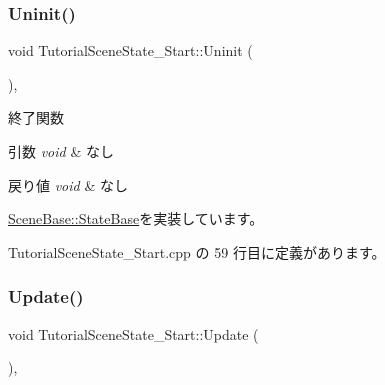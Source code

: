 \mbox{\label{class_tutorial_scene_state___start_a974962addfb0bcba90fbab64ac6d50f0}} 
\subsubsection{\texorpdfstring{Uninit()}{Uninit()}}
{\footnotesize\ttfamily void Tutorial\+Scene\+State\+\_\+\+Start\+::\+Uninit (\begin{DoxyParamCaption}{ }\end{DoxyParamCaption})\hspace{0.3cm}{\ttfamily [override]}, {\ttfamily [virtual]}}



終了関数 


\begin{DoxyParams}{引数}
{\em void} & なし \\
\hline
\end{DoxyParams}

\begin{DoxyRetVals}{戻り値}
{\em void} & なし \\
\hline
\end{DoxyRetVals}


\mbox{\hyperlink{class_scene_base_1_1_state_base_a2763fa37e45b39bd8d3bbb735c76c59b}{Scene\+Base\+::\+State\+Base}}を実装しています。



 Tutorial\+Scene\+State\+\_\+\+Start.\+cpp の 59 行目に定義があります。

\mbox{\label{class_tutorial_scene_state___start_a93c322692bf56172f383d3e5b17cd85c}} 
\subsubsection{\texorpdfstring{Update()}{Update()}}
{\footnotesize\ttfamily void Tutorial\+Scene\+State\+\_\+\+Start\+::\+Update (\begin{DoxyParamCaption}{ }\end{DoxyParamCaption})\hspace{0.3cm}{\ttfamily [override]}, {\ttfamily [virtual]}}



